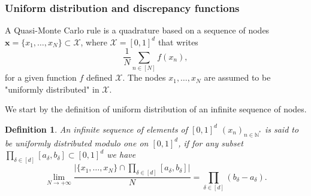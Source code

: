 \documentclass[twoside,11pt]{book}
\newtheorem{definition}{Definition}
\numberwithin{theorem}{chapter}
\numberwithin{definition}{chapter}
\numberwithin{proposition}{chapter}
\numberwithin{corollary}{chapter}
\numberwithin{example}{chapter}
\numberwithin{lemma}{chapter}
\numberwithin{assumption}{chapter}
\begin{document}









 
\subsubsection{Uniform distribution and discrepancy functions}

A Quasi-Monte Carlo rule is a quadrature based on a sequence of nodes $\bm{x} = \{ x_{1}, \dots, x_{N} \} \subset \mathcal{X}$, where $\mathcal{X} = [0,1]^{d}$ that writes
\begin{equation}
\frac{1}{N}\sum\limits_{n \in [N]} f(x_{n}),
\end{equation}
for a given function $f$ defined $\mathcal{X}$. The nodes $x_{1}, \dots, x_{N}$ are assumed to be "uniformly distributed" in $\mathcal{X}$. 

We start by the definition of uniform distribution of an infinite sequence of nodes.

\begin{definition}
An infinite sequence of elements of $[0,1]^{d}$ $(x_{n})_{n \in \mathbb{N}^{*}}$ is said to be \emph{uniformly distributed modulo one} on $[0,1]^{d}$, if for any subset $\prod\limits_{\delta \in [d]}[a_\delta,b_\delta] \subset [0,1]^{d}$ we have
\begin{equation}\label{eq:unif_dist_modulo_one}
\lim\limits_{N \rightarrow +\infty} \frac{\big|\{x_{1}, \dots, x_{N}\} \cap \prod_{\delta \in [d]}[a_\delta,b_\delta]\big|}{N} = \prod\limits_{\delta \in [d]} (b_{\delta}-a_{\delta}).
\end{equation}
\end{definition}
\end{document}
